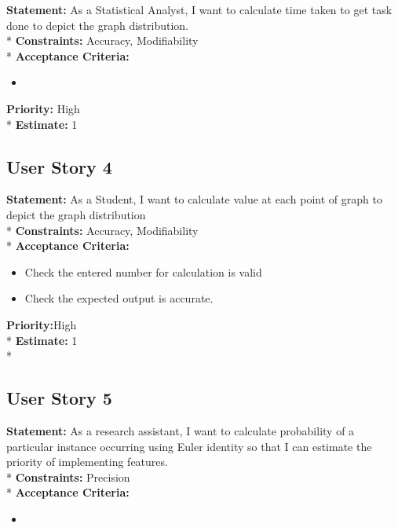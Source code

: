 \documentclass{article}
\begin{document}
\noindent \textbf {Statement: }As a Statistical Analyst, I want to calculate time taken to get task done to depict the graph distribution. \\*
\newline 
\noindent \textbf {Constraints:}  Accuracy, Modifiability\\*
\newline
\textbf{Acceptance Criteria: } 
\begin{itemize}
  \item 
\end{itemize}

\noindent \textbf {Priority: }High\\*
\newline
\noindent \textbf {Estimate: } 1
\newline

\subsection{User Story 4} %

\noindent \textbf {Statement: }As a Student, I want to calculate value at each point of graph to depict the graph distribution \\*
\newline 
\noindent \textbf {Constraints:}  Accuracy, Modifiability\\*
\newline
\textbf{Acceptance Criteria: } 
\begin{itemize}
  \item Check the entered number for calculation is valid
  \item Check the expected output is accurate.
  
\end{itemize}

\noindent \textbf {Priority:}High\\*
\newline
\noindent \textbf {Estimate:} 1\\*
\newline

\subsection{User Story 5} %

\noindent \textbf {Statement: }As a research assistant, I want to calculate probability of a particular instance occurring using Euler identity  so that I can estimate the priority of implementing features. \\*
\newline 
\noindent \textbf {Constraints:}  Precision\\*
\newline
\textbf{Acceptance Criteria: } 
\begin{itemize}
  \item 
\end{itemize}
\end{document}
